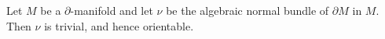 Let $M$ be a $\partial$-manifold and let $\nu$ be the algebraic normal bundle of $\partial M$ in $M$. Then $\nu$ is trivial, and hence orientable.
